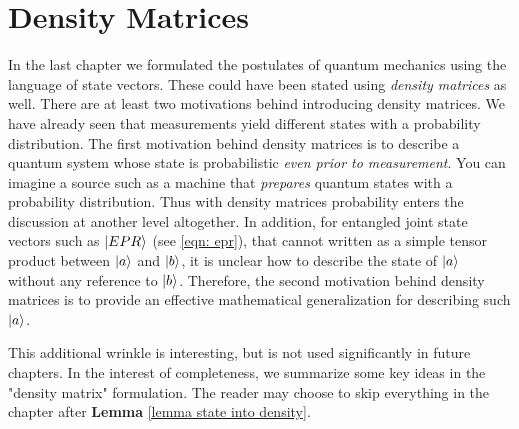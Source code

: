 
\chapter{Density Matrices} %

\label{Chapter4-density matrix} %


In the last chapter we formulated the postulates of quantum mechanics using the language of state vectors. These could have been stated using \textit{density matrices} as well. 
{\color{green}
There are at least two motivations behind introducing density matrices. We have already seen that measurements yield different states with a probability distribution. The first motivation behind density matrices is to describe a quantum system whose state is probabilistic {\emph{even prior to measurement}}. You can imagine a source such as a machine that \emph{prepares} quantum states with a probability distribution. Thus with density matrices probability enters the discussion at another level altogether.
In addition, for entangled joint state vectors such as $\ket{EPR}$ (see \eqref{eqn: epr}), that cannot written as a simple tensor product between $\ket{a}$ and $\ket{b}$, it is unclear how to describe the state of $\ket{a}$ without any reference to $\ket{b}$. Therefore, the second motivation behind density matrices is to provide an effective mathematical generalization for describing such $\ket{a}$. 
}

This additional wrinkle is interesting, but is not used significantly in future chapters.  In the interest of completeness, we summarize some key ideas in the "density matrix" formulation.  The reader may choose to skip everything in the chapter after {\bf{Lemma}} \ref{lemma state into density}.

